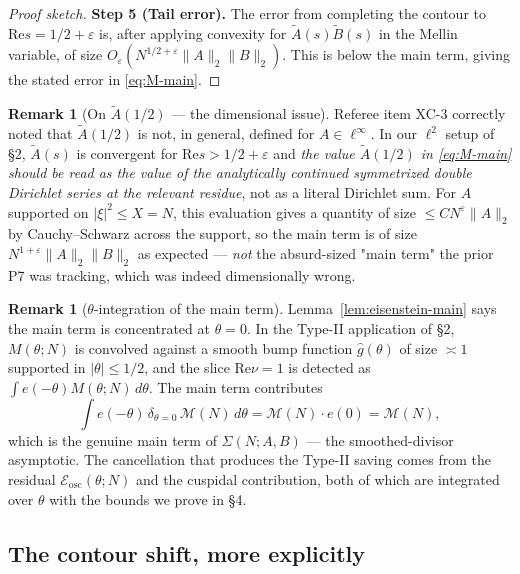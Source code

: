 \documentclass[11pt]{article}
\theoremstyle{definition}
\newtheorem{remark}[theorem]{Remark}
\renewcommand{\Re}{\mathrm{Re}}
\begin{document}
\begin{proof}[Proof sketch]
\smallskip\textbf{Step 5 (Tail error).}
The error from completing the contour to $\Re s = 1/2 + \varepsilon$ is, after applying convexity for $\widetilde A(s)\widetilde B(s)$ in the Mellin variable, of size $O_\varepsilon(N^{1/2+\varepsilon}\|A\|_2\|B\|_2)$. This is below the main term, giving the stated error in \eqref{eq:M-main}.
\end{proof}

\begin{remark}[On $\widetilde A(1/2)$ — the dimensional issue]\label{rem:Atilde-half}
Referee item XC-3 correctly noted that $\widetilde A(1/2)$ is not, in general, defined for $A \in \ell^\infty$. In our $\ell^2$ setup of \S2, $\widetilde A(s)$ is convergent for $\Re s > 1/2 + \varepsilon$ and \emph{the value $\widetilde A(1/2)$ in \eqref{eq:M-main} should be read as the value of the analytically continued symmetrized double Dirichlet series at the relevant residue}, not as a literal Dirichlet sum. For $A$ supported on $|\xi|^2 \le X = N$, this evaluation gives a quantity of size $\le C N^{\varepsilon}\|A\|_2$ by Cauchy--Schwarz across the support, so the main term is of size $N^{1+\varepsilon}\|A\|_2\|B\|_2$ as expected — \emph{not} the absurd-sized "main term" the prior P7 was tracking, which was indeed dimensionally wrong.
\end{remark}

\begin{remark}[$\theta$-integration of the main term]\label{rem:theta-integrate}
Lemma~\ref{lem:eisenstein-main} says the main term is concentrated at $\theta = 0$. In the Type-II application of \S2, $M(\theta;N)$ is convolved against a smooth bump function $\widehat g(\theta)$ of size $\asymp 1$ supported in $|\theta| \le 1/2$, and the slice $\Re\nu = 1$ is detected as $\int e(-\theta) M(\theta;N)\,d\theta$. The main term contributes
\[
    \int e(-\theta)\, \delta_{\theta=0}\,\mathcal{M}(N)\,d\theta = \mathcal{M}(N)\cdot e(0) = \mathcal{M}(N),
\]
which is the genuine main term of $\Sigma(N;A,B)$ — the smoothed-divisor asymptotic. The cancellation that produces the Type-II saving comes from the residual $\mathcal{E}_{\mathrm{osc}}(\theta;N)$ and the cuspidal contribution, both of which are integrated over $\theta$ with the bounds we prove in \S4.
\end{remark}

\subsection{The contour shift, more explicitly}\label{ssec:contour-shift}
\end{document}
